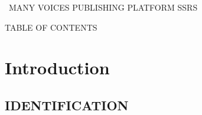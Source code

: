 \documentclass[letterpaper, 10pt, draftclsnofoot, compsoc, onecolumn]{IEEEtran}
\makeatletter
\newcommand\arraybslash{\let\\\@arraycr}
\makeatother
\begin{document}

\clearpage
{\centering
{\MakeUppercase{\ }}{\MakeUppercase{Many Voices Publishing Platform SSRS}}
\par}

{\centering
TABLE OF CONTENTS
\par}

\setcounter{tocdepth}{9}
\tableofcontents


\clearpage

\setcounter{page}{1}\pagestyle{fancy}
\section[Introduction]{\rmfamily\bfseries\color{black} Introduction}

\subsection[IDENTIFICATION]{\rmfamily\bfseries\color{black} IDENTIFICATION}
\end{document}
